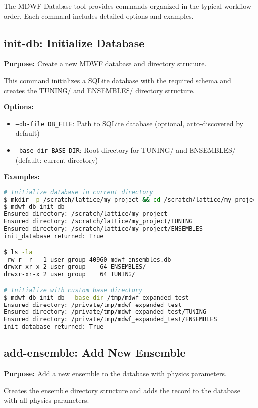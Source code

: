 \documentclass{article}
\begin{document}
The MDWF Database tool provides commands organized in the typical workflow order. Each command includes detailed options and examples.

\subsection{init-db: Initialize Database}

\textbf{Purpose:} Create a new MDWF database and directory structure.

This command initializes a SQLite database with the required schema and creates the TUNING/ and ENSEMBLES/ directory structure.

\textbf{Options:}
\begin{itemize}
\item \texttt{--db-file DB\_FILE}: Path to SQLite database (optional, auto-discovered by default)
\item \texttt{--base-dir BASE\_DIR}: Root directory for TUNING/ and ENSEMBLES/ (default: current directory)
\end{itemize}

\textbf{Examples:}

\begin{lstlisting}[language=bash]
# Initialize database in current directory
$ mkdir -p /scratch/lattice/my_project && cd /scratch/lattice/my_project
$ mdwf_db init-db
Ensured directory: /scratch/lattice/my_project
Ensured directory: /scratch/lattice/my_project/TUNING  
Ensured directory: /scratch/lattice/my_project/ENSEMBLES
init_database returned: True

$ ls -la
-rw-r--r-- 1 user group 40960 mdwf_ensembles.db
drwxr-xr-x 2 user group    64 ENSEMBLES/
drwxr-xr-x 2 user group    64 TUNING/

# Initialize with custom base directory
$ mdwf_db init-db --base-dir /tmp/mdwf_expanded_test
Ensured directory: /private/tmp/mdwf_expanded_test
Ensured directory: /private/tmp/mdwf_expanded_test/TUNING
Ensured directory: /private/tmp/mdwf_expanded_test/ENSEMBLES
init_database returned: True
\end{lstlisting}

\subsection{add-ensemble: Add New Ensemble}

\textbf{Purpose:} Add a new ensemble to the database with physics parameters.

Creates the ensemble directory structure and adds the record to the database with all physics parameters.
\end{document}
